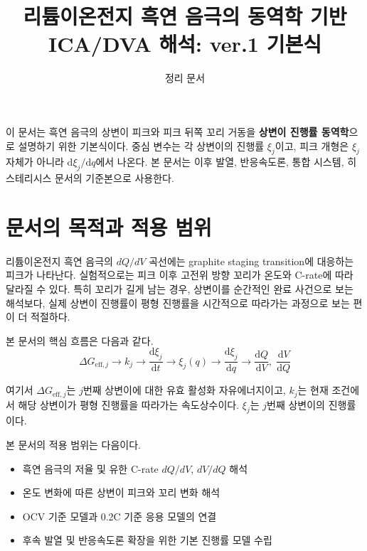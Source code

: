 \documentclass[11pt,a4paper]{article}
\title{\Large \textbf{리튬이온전지 흑연 음극의 동역학 기반 ICA/DVA 해석: ver.1 기본식}}
\author{정리 문서}
\date{}
\newcommand{\dd}{\mathrm{d}}
\newcommand{\eff}{\mathrm{eff}}
\begin{document}
\maketitle

\begin{center}
\begin{minipage}{0.92\textwidth}
이 문서는 흑연 음극의 상변이 피크와 피크 뒤쪽 꼬리 거동을 \textbf{상변이 진행률 동역학}으로 설명하기 위한 기본식이다. 중심 변수는 각 상변이의 진행률 \(\xi_j\)이고, 피크 개형은 \(\xi_j\) 자체가 아니라 \(\dd\xi_j/\dd q\)에서 나온다. 본 문서는 이후 발열, 반응속도론, 통합 시스템, 히스테리시스 문서의 기준본으로 사용한다.
\end{minipage}
\end{center}

\tableofcontents
\newpage

\section{문서의 목적과 적용 범위}
리튬이온전지 흑연 음극의 \(dQ/dV\) 곡선에는 graphite staging transition에 대응하는 피크가 나타난다. 실험적으로는 피크 이후 고전위 방향 꼬리가 온도와 C-rate에 따라 달라질 수 있다. 특히 꼬리가 길게 남는 경우, 상변이를 순간적인 완료 사건으로 보는 해석보다, 실제 상변이 진행률이 평형 진행률을 시간적으로 따라가는 과정으로 보는 편이 더 적절하다.

본 문서의 핵심 흐름은 다음과 같다.
\begin{equation}
\Delta G_{\eff,j}
\rightarrow
k_j
\rightarrow
\frac{\dd\xi_j}{\dd t}
\rightarrow
\xi_j(q)
\rightarrow
\frac{\dd\xi_j}{\dd q}
\rightarrow
\frac{\dd Q}{\dd V},\;\frac{\dd V}{\dd Q}
\label{eq:main_spine}
\end{equation}

여기서 \(\Delta G_{\eff,j}\)는 \(j\)번째 상변이에 대한 유효 활성화 자유에너지이고, \(k_j\)는 현재 조건에서 해당 상변이가 평형 진행률을 따라가는 속도상수이다. \(\xi_j\)는 \(j\)번째 상변이의 진행률이다.

본 문서의 적용 범위는 다음이다.
\begin{itemize}
\item 흑연 음극의 저율 및 유한 C-rate \(dQ/dV\), \(dV/dQ\) 해석
\item 온도 변화에 따른 상변이 피크와 꼬리 변화 해석
\item OCV 기준 모델과 0.2C 기준 응용 모델의 연결
\item 후속 발열 및 반응속도론 확장을 위한 기본 진행률 모델 수립
\end{itemize}
\end{document}
